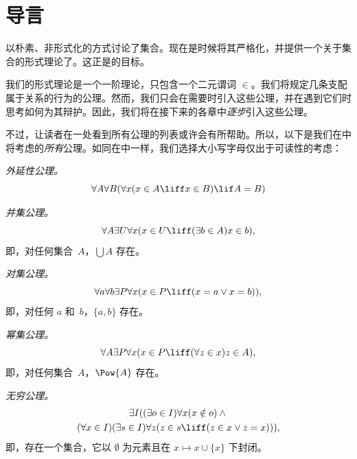 
\section*{导言}

以朴素、非形式化的方式讨论了集合。现在是时候将其严格化，并提供一个关于集合的形式理论了。这正是的目标。

我们的形式理论是一个一阶理论，只包含一个二元谓词 $\in$。我们将规定几条支配属于关系的行为的公理。然而，我们只会在需要时引入这些公理，并在遇到它们时思考如何为其辩护。因此，我们将在接下来的各章中\emph{逐步}引入这些公理。

不过，让读者在一处看到所有公理的列表或许会有所帮助。所以，以下是我们在中将考虑的\emph{所有}公理。如同在中一样，我们选择大小写字母仅出于可读性的考虑：

\begin{defish}
\emph{外延性公理。}
\[\forall A \forall B(\forall x(x \in A \liff x \in B) \lif A = B)\]
\end{defish}

\begin{defish}
\emph{并集公理。}
\[
\forall A \exists U \forall x(x \in U \liff (\exists b \in A)x \in b),
\]
即，对任何集合~$A$，$\bigcup A$ 存在。
\end{defish}

\begin{defish}
\emph{对集公理。}
\[
\forall a \forall b \exists P \forall x (x \in P \liff
(x = a \lor x = b)),
\]
即，对任何 $a$ 和~$b$，$\{a, b\}$ 存在。
\end{defish}

\begin{defish}
\emph{幂集公理。}
\[
\forall A \exists P \forall x(x \in P \liff (\forall z \in x)z \in A),
\]
即，对任何集合~$A$，$\Pow{A}$ 存在。
\end{defish}

\begin{defish}
\emph{无穷公理。}
\begin{multline*}
\exists I((\exists o \in I)\forall x(x \notin o) \land {}\\
(\forall x \in I)(\exists s \in I)\forall z(z \in s \liff (z \in x \lor z = x))),
\end{multline*}
即，存在一个集合，它以 $\emptyset$ 为元素且在 $x \mapsto x \cup \{x\}$ 下封闭。
\end{defish}

